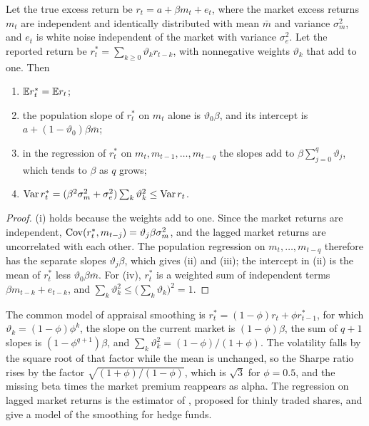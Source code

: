 \begin{chapterrefs}
\begin{proposition}\label{prop7:stale}
Let the true excess return be $r_t=a+\beta m_t+e_t$, where the market excess returns $m_t$ are
independent and identically distributed with mean $\bar m$ and variance $\sigma_m^2$, and $e_t$ is
white noise independent of the market with variance $\sigma_e^2$. Let the reported return be
$r^*_t=\sum_{k\ge0}\vartheta_kr_{t-k}$, with nonnegative weights $\vartheta_k$ that add to one. Then
\begin{enumerate}[label=(\roman*)]
  \item $\mathbb{E} r^*_t=\mathbb{E} r_t$;
  \item the population slope of $r^*_t$ on $m_t$ alone is $\vartheta_0\beta$, and its intercept is
  $a+(1-\vartheta_0)\beta\bar m$;
  \item in the regression of $r^*_t$ on $m_t,m_{t-1},\dots,m_{t-q}$ the slopes add to
  $\beta\sum_{j=0}^q\vartheta_j$, which tends to $\beta$ as $q$ grows;
  \item $\operatorname{Var} r^*_t=(\beta^2\sigma_m^2+\sigma_e^2)\sum_k\vartheta_k^2\le\operatorname{Var} r_t$.
\end{enumerate}
\end{proposition}

\begin{proof}
(i) holds because the weights add to one. Since the market returns are independent,
$\operatorname{Cov}(r^*_t,m_{t-j})=\vartheta_j\beta\sigma_m^2$, and the lagged market returns are uncorrelated with
each other. The population regression on $m_t,\dots,m_{t-q}$ therefore has the separate slopes
$\vartheta_j\beta$, which gives (ii) and (iii); the intercept in (ii) is the mean of $r^*_t$ less
$\vartheta_0\beta\bar m$. For (iv), $r^*_t$ is a weighted sum of independent terms $\beta m_{t-k}+e_{t-k}$,
and $\sum_k\vartheta_k^2\le\bigl(\sum_k\vartheta_k\bigr)^2=1$.
\end{proof}

The common model of appraisal smoothing is $r^*_t=(1-\phi)r_t+\phi r^*_{t-1}$, for which
$\vartheta_k=(1-\phi)\phi^k$, the slope on the current market is $(1-\phi)\beta$, the sum of $q+1$ slopes
is $(1-\phi^{q+1})\beta$, and $\sum_k\vartheta_k^2=(1-\phi)/(1+\phi)$. The volatility falls by the
square root of that factor while the mean is unchanged, so the Sharpe ratio rises by the factor
$\sqrt{(1+\phi)/(1-\phi)}$, which is $\sqrt3$ for $\phi=0.5$, and
the missing beta times the market premium reappears as alpha. The regression on lagged market
returns is the estimator of \textcite{dimson1979}, proposed for thinly traded shares, and
\textcite{getmansky2004} give a model of the smoothing for hedge funds.


\end{chapterrefs}
